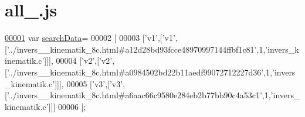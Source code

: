 \hypertarget{all__16_8js_source}{}\section{all\+\_.\+js}
\label{all__16_8js_source}

\begin{DoxyCode}
\hypertarget{all__16_8js_source.tex_l00001}{}\hyperlink{all__16_8js_ad01a7523f103d6242ef9b0451861231e}{00001} var \hyperlink{all__16_8js_ad01a7523f103d6242ef9b0451861231e}{searchData}=
00002 [
00003   [\textcolor{stringliteral}{'v1'},[\textcolor{stringliteral}{'v1'},[\textcolor{stringliteral}{'../invers\_\_kinematik\_8c.html#a12d28bd93fcce48970997144ffbf1c81'},1,\textcolor{stringliteral}{'invers\_kinematik.c'}]]],
00004   [\textcolor{stringliteral}{'v2'},[\textcolor{stringliteral}{'v2'},[\textcolor{stringliteral}{'../invers\_\_kinematik\_8c.html#a0984502bd22b11aedf99072712227d36'},1,\textcolor{stringliteral}{'invers\_kinematik.c'}]]],
00005   [\textcolor{stringliteral}{'v3'},[\textcolor{stringliteral}{'v3'},[\textcolor{stringliteral}{'../invers\_\_kinematik\_8c.html#a6aac66c9580e284eb2b77bb90c4a53c1'},1,\textcolor{stringliteral}{'invers\_kinematik.c'}]]]
00006 ];
\end{DoxyCode}
